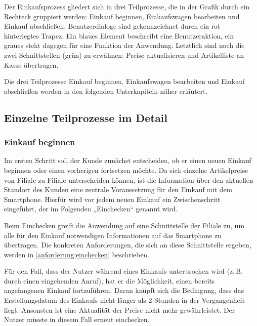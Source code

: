 Der Einkaufsprozess gliedert sich in drei Teilprozesse, die in der Grafik durch ein Rechteck gruppiert werden: Einkauf beginnen, Einkaufswagen bearbeiten und Einkauf abschließen. Benutzerdialoge sind gekennzeichnet durch ein rot hinterlegtes Trapez. Ein blaues Element beschreibt eine Benutzeraktion, ein graues steht dagegen für eine Funktion der Anwendung. Letztlich sind noch die zwei Schnittstellen (grün) zu erwähnen: Preise aktualisieren und Artikelliste an Kasse übertragen.

Die drei Teilprozesse Einkauf beginnen, Einkaufswagen bearbeiten und Einkauf abschließen werden in den folgenden Unterkapiteln näher erläutert.

\subsection{Einzelne Teilprozesse im Detail}\label{konzept:teilprozesse}

\subsubsection*{Einkauf beginnen}
Im ersten Schritt soll der Kunde zunächst entscheiden, ob er einen neuen Einkauf beginnen oder einen vorherigen fortsetzen möchte. Da sich einzelne Artikelpreise von Filiale zu Filiale unterscheiden können, ist die Information über den aktuellen Standort des Kunden eine zentrale Voraussetzung für den Einkauf mit dem Smartphone. Hierfür wird vor jedem neuen Einkauf ein Zwischenschritt eingeführt, der im Folgenden „Einchecken“ genannt wird.

Beim Einchecken greift die Anwendung auf eine Schnittstelle der Filiale zu, um alle für den Einkauf notwendigen Informationen auf das Smartphone zu übertragen. Die konkreten Anforderungen, die sich an diese Schnittstelle ergeben, werden in \vref{anforderung:einchecken} beschrieben.


Für den Fall, dass der Nutzer während eines Einkaufs unterbrochen wird (z.\,B. durch einen eingehenden Anruf), hat er die Möglichkeit, einen bereits angefangenen Einkauf fortzuführen. Daran knüpft sich die Bedingung, dass das Erstellungsdatum des Einkaufs nicht länger als 2 Stunden in der Vergangenheit liegt. Ansonsten ist eine Aktualität der Preise nicht mehr gewährleistet. Der Nutzer müsste in diesem Fall erneut einchecken.

